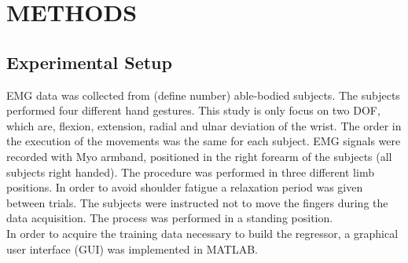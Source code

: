 \documentclass[a4paper, 10pt, conference]{ieeeconf}      %
\begin{document}
	\section{METHODS}
	
	\subsection{Experimental Setup}
EMG data was collected from (define number) able-bodied subjects. The subjects performed four different hand gestures. This study is only focus on two DOF, which are, flexion, extension, radial and ulnar deviation of the wrist. The order in the execution of the movements was the same for each subject. EMG signals were recorded with Myo armband, positioned in the right forearm of the subjects (all subjects right handed). The procedure was performed in three different limb positions. In order to avoid shoulder fatigue a relaxation period was given between trials. The subjects were instructed not to move the fingers during the data acquisition. The process was performed in a standing position. \\ %
 In order to acquire the training data necessary to build the regressor, a graphical user interface (GUI) was implemented in MATLAB. %
\end{document}
